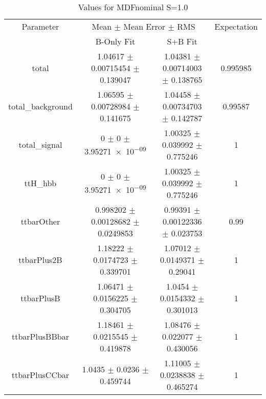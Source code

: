 \begin{table}
\centering
\caption{Values for MDFnominal S=1.0}
\begin{tabular}{cccc}
\toprule
Parameter & \multicolumn{2}{c}{Mean $\pm$ Mean Error $\pm$ RMS} & Expectation\\
 & B-Only Fit & S+B Fit & \\
\midrule
total & \num{1.04617} $\pm$ \num{0.00715454} $\pm$ \num{0.139047} & \num{1.04381} $\pm$ \num{0.00714003} $\pm$ \num{0.138765} & \num{0.995985}\\
total\_background & \num{1.06595} $\pm$ \num{0.00728984} $\pm$ \num{0.141675} & \num{1.04458} $\pm$ \num{0.00734703} $\pm$ \num{0.142787} & \num{0.99587}\\
total\_signal & \num{0} $\pm$ \num{0} $\pm$ \num{3.95271e-09} & \num{1.00325} $\pm$ \num{0.039992} $\pm$ \num{0.775246} & \num{1}\\
ttH\_hbb & \num{0} $\pm$ \num{0} $\pm$ \num{3.95271e-09} & \num{1.00325} $\pm$ \num{0.039992} $\pm$ \num{0.775246} & \num{1}\\
ttbarOther & \num{0.998202} $\pm$ \num{0.00128682} $\pm$ \num{0.0249853} & \num{0.99391} $\pm$ \num{0.00122336} $\pm$ \num{0.023753} & \num{0.99}\\
ttbarPlus2B & \num{1.18222} $\pm$ \num{0.0174723} $\pm$ \num{0.339701} & \num{1.07012} $\pm$ \num{0.0149371} $\pm$ \num{0.29041} & \num{1}\\
ttbarPlusB & \num{1.06471} $\pm$ \num{0.0156225} $\pm$ \num{0.304705} & \num{1.0454} $\pm$ \num{0.0154332} $\pm$ \num{0.301013} & \num{1}\\
ttbarPlusBBbar & \num{1.18461} $\pm$ \num{0.0215545} $\pm$ \num{0.419878} & \num{1.08476} $\pm$ \num{0.022077} $\pm$ \num{0.430056} & \num{1}\\
ttbarPlusCCbar & \num{1.0435} $\pm$ \num{0.0236} $\pm$ \num{0.459744} & \num{1.11005} $\pm$ \num{0.0238838} $\pm$ \num{0.465274} & \num{1}\\
\bottomrule
\end{tabular}
\end{table}